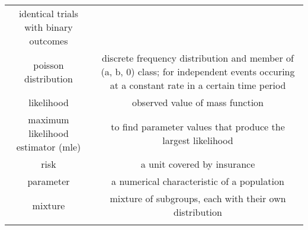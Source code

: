 \documentclass[]{book}
\begin{document}
\begin{longtable}[]{@{}cc@{}}
\begin{minipage}[t]{0.43\columnwidth}
identical trials with binary outcomes\strut
\end{minipage}\tabularnewline
\begin{minipage}[t]{0.43\columnwidth}\centering\strut
poisson distribution\strut
\end{minipage} & \begin{minipage}[t]{0.43\columnwidth}\centering\strut
discrete frequency distribution and member of (a, b, 0) class; for
independent events occuring at a constant rate in a certain time
period\strut
\end{minipage}\tabularnewline
\begin{minipage}[t]{0.43\columnwidth}\centering\strut
likelihood\strut
\end{minipage} & \begin{minipage}[t]{0.43\columnwidth}\centering\strut
observed value of mass function\strut
\end{minipage}\tabularnewline
\begin{minipage}[t]{0.43\columnwidth}\centering\strut
maximum likelihood estimator (mle)\strut
\end{minipage} & \begin{minipage}[t]{0.43\columnwidth}\centering\strut
to find parameter values that produce the largest likelihood\strut
\end{minipage}\tabularnewline
\begin{minipage}[t]{0.43\columnwidth}\centering\strut
risk\strut
\end{minipage} & \begin{minipage}[t]{0.43\columnwidth}\centering\strut
a unit covered by insurance\strut
\end{minipage}\tabularnewline
\begin{minipage}[t]{0.43\columnwidth}\centering\strut
parameter\strut
\end{minipage} & \begin{minipage}[t]{0.43\columnwidth}\centering\strut
a numerical characteristic of a population\strut
\end{minipage}\tabularnewline
\begin{minipage}[t]{0.43\columnwidth}\centering\strut
mixture\strut
\end{minipage} & \begin{minipage}[t]{0.43\columnwidth}\centering\strut
mixture of subgroups, each with their own distribution\strut
\end{minipage}\tabularnewline
\begin{minipage}[t]{0.43\columnwidth}\centering\strut

\end{minipage}
\end{longtable}
\end{document}
